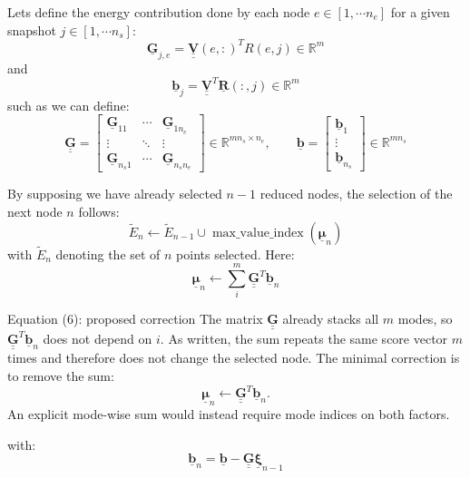 \documentclass[a4paper,12pt]{article}
\newcommand{\vect}[1]{\underline{\boldsymbol{#1}}}
\newcommand{\matr}[1]{\underline{\underline{\boldsymbol{#1}}}}
\newcommand{\lecturanota}[2]{\begin{lecturalarga}{#1}#2\end{lecturalarga}}
\begin{document}
Lets define the energy contribution done by each node $e\in[1,\cdots n_e]$ for a given snapshot $j\in[1,\cdots n_s]$:
\begin{equation}
\vect{G}_{j,e}=\matr{V}(e,:)^{T}R(e,j)\in\mathbb{R}^{m}
\label{eq:classic-node-contribution}
\end{equation}
and
\begin{equation}
\vect{b}_j=\matr{V}^{T}\vect{R}(:,j)\in\mathbb{R}^{m}
\label{eq:classic-target}
\end{equation}
such as we can define:
\[
\matr{G}=
\begin{bmatrix}
\vect{G}_{11} & \cdots & \vect{G}_{1n_e}\\
\vdots & \ddots & \vdots\\
\vect{G}_{n_s1} & \cdots & \vect{G}_{n_sn_e}
\end{bmatrix}
\in\mathbb{R}^{mn_s\times n_e},
\qquad
\vect{b}=
\begin{bmatrix}
\vect{b}_1\\
\vdots\\
\vect{b}_{n_s}
\end{bmatrix}
\in\mathbb{R}^{mn_s}
\]

\newpage
By supposing we have already selected $n-1$ reduced nodes, the selection of the next node $n$ follows:
\begin{equation}
\widetilde{E}_n\leftarrow
\widetilde{E}_{n-1}\cup
\operatorname{max\_value\_index}(\vect{\mu}_n)
\label{eq:classic-select}
\end{equation}
with $\widetilde{E}_n$ denoting the set of $n$ points selected. Here:
\begin{equation}
\vect{\mu}_n\leftarrow\sum_i^m\matr{G}^{T}\vect{b}_n
\label{eq:classic-score}
\end{equation}

\lecturanota{Equation (6): proposed correction}{
The matrix $\matr{G}$ already stacks all $m$ modes, so $\matr{G}^{T}\vect{b}_n$ does not depend on $i$. As written, the sum repeats the same score vector $m$ times and therefore does not change the selected node. The minimal correction is to remove the sum:
\[
  \vect{\mu}_n\leftarrow\matr{G}^{T}\vect{b}_n.
\]
An explicit mode-wise sum would instead require mode indices on both factors.
}

with:
\begin{equation}
\vect{b}_n=\vect{b}-\matr{G}\vect{\xi}_{n-1}
\label{eq:classic-remaining}
\end{equation}
\end{document}
